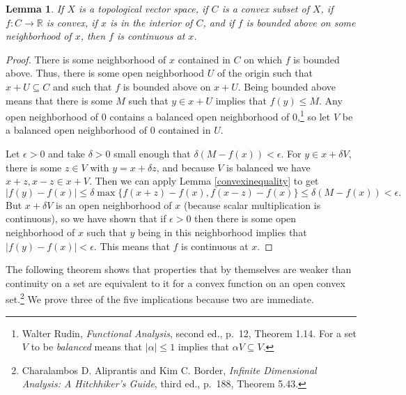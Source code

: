 \documentclass{article}
\newtheorem{lemma}[theorem]{Lemma}
\theoremstyle{definition}
\begin{document}
\begin{lemma}
If $X$ is a topological vector space, if $C$ is a convex subset of $X$, if $f:C \to \mathbb{R}$ is convex, if $x$ is in the interior
of $C$, and if $f$ is bounded above on some neighborhood of $x$, then $f$ is continuous at $x$.
\label{localcontinuity}
\end{lemma}
\begin{proof}
There is some neighborhood of $x$ contained in $C$ on which $f$ is bounded above. Thus, there is some open neighborhood $U$ of the origin
such that $x+U \subseteq C$ and such that $f$ is bounded above on $x+U$. Being bounded above means that there is some $M$ such that $y \in x+U$ implies that $f(y) \leq M$. Any open neighborhood of $0$ contains a balanced open neighborhood of $0$,\footnote{Walter
Rudin, {\em Functional Analysis}, second ed., p.~12, Theorem 1.14. For a set $V$ to be {\em balanced} means that $|\alpha| \leq 1$ implies
that $\alpha V \subseteq V$.} so let $V$ be a balanced open neighborhood of $0$ contained in $U$. 

Let $\epsilon>0$ and take
$\delta>0$ small enough that $\delta (M-f(x))<\epsilon$. 
For $y \in x+\delta V$, there is some $z \in V$ with
$y=x+\delta z$, and because $V$ is balanced we have $x+z,x-z \in x+V$.  Then we can apply
Lemma \ref{convexinequality} to get
\[
|f(y)-f(x)| \leq \delta \max \{f(x+z)-f(x),f(x-z)-f(x)\} \leq \delta (M-f(x))<\epsilon.
\]
But $x+\delta V$ is an open neighborhood of $x$ (because scalar multiplication is continuous), so we have shown that if $\epsilon>0$ then there is some open neighborhood of $x$ such that
$y$ being in this neighborhood implies that $|f(y)-f(x)| < \epsilon$. This means that $f$ is continuous at $x$.
\end{proof}

The following theorem shows that properties that by themselves are weaker than continuity on a set are equivalent to it for a convex function on an open convex set.\footnote{Charalambos D. Aliprantis and Kim C. Border,
{\em Infinite Dimensional Analysis: A Hitchhiker's Guide}, third ed., p.~188, Theorem 5.43.} We prove three of the five implications because two are immediate.
\end{document}
